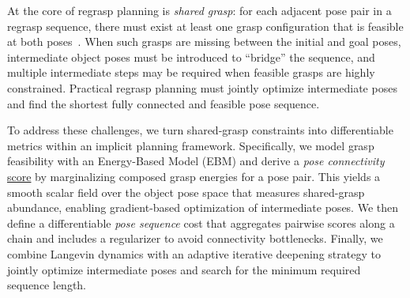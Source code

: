 \documentclass[journal, twoside]{IEEEtran}
\newif\ifshownotes
\newcommand{\lqin}[1]{\ifshownotes{\color{darkgreen}\begin{CJK*}{UTF8}{gkai}\small#1\end{CJK*}}\fi}
\begin{document}
At the core of regrasp planning is \textit{shared grasp}: for each adjacent pose pair in a regrasp sequence, there must exist at least one grasp configuration that is feasible at both poses~\cite{simeon2004manipulation}. When such grasps are missing between the initial and goal poses, intermediate object poses must be introduced to ``bridge'' the sequence, and multiple intermediate steps may be required when feasible grasps are highly constrained. Practical regrasp planning must jointly optimize intermediate poses and find the shortest fully connected and feasible pose sequence.

To address these challenges, we turn shared-grasp constraints into differentiable metrics within an implicit planning framework. Specifically, we model grasp feasibility with an Energy-Based Model (EBM) and derive a \textit{pose connectivity} \uline{score}\lqin{全文用cost是否更好？score的感觉是越高越好，但$Q_{\mathrm{pair}}$应该是越负连通性越好。} by marginalizing composed grasp energies for a pose pair. This yields a smooth scalar field over the object pose space that measures shared-grasp abundance, enabling gradient-based optimization of intermediate poses. We then define a differentiable \textit{pose sequence} cost that aggregates pairwise scores along a chain and includes a regularizer to avoid connectivity bottlenecks. Finally, we combine Langevin dynamics with an adaptive iterative deepening strategy to jointly optimize intermediate poses and search for the minimum required sequence length.
\end{document}

